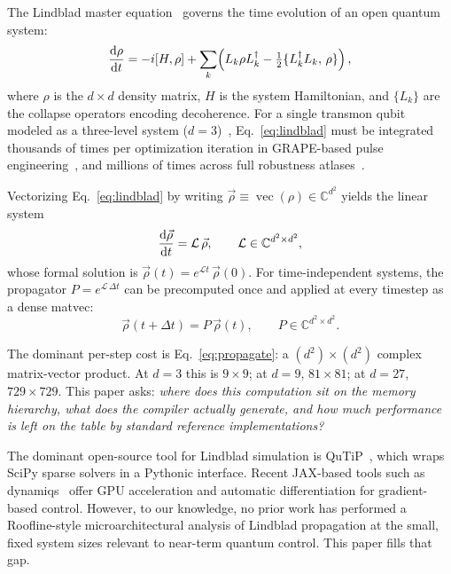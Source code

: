 \documentclass[a4paper,noarxiv]{quantumarticle}
\begin{document}
The Lindblad master equation~\cite{Lindblad1976,Gorini1976} governs the
time evolution of an open quantum system:
\begin{equation}
  \label{eq:lindblad}
  \dv{\rho}{t} = -i[H, \rho]
    + \sum_k \!\left( L_k \rho L_k^\dagger
                    - \tfrac{1}{2}\{L_k^\dagger L_k,\, \rho\} \right),
\end{equation}
where $\rho$ is the $d \times d$ density matrix, $H$ is the system
Hamiltonian, and $\{L_k\}$ are the collapse operators encoding decoherence.
%
For a single transmon qubit modeled as a three-level system
($d = 3$)~\cite{Koch2007}, Eq.~\eqref{eq:lindblad} must be integrated
thousands of times per optimization iteration in GRAPE-based pulse
engineering~\cite{Khaneja2005}, and millions of times across full robustness
atlases~\cite{Malarchick2025QPO}.

Vectorizing Eq.~\eqref{eq:lindblad} by writing $\vec\rho \equiv
\operatorname{vec}(\rho) \in \mathbb{C}^{d^2}$ yields the linear system
\begin{equation}
  \label{eq:lindblad_vec}
  \dv{\vec\rho}{t} = \mathcal{L}\,\vec\rho,
  \qquad \mathcal{L} \in \mathbb{C}^{d^2 \times d^2},
\end{equation}
whose formal solution is $\vec\rho(t) = e^{\mathcal{L} t}\,\vec\rho(0)$.
For time-independent systems, the propagator $P = e^{\mathcal{L}\,\Delta t}$
can be precomputed once and applied at every timestep as a dense matvec:
\begin{equation}
  \label{eq:propagate}
  \vec\rho(t + \Delta t) = P\,\vec\rho(t),
  \qquad P \in \mathbb{C}^{d^2 \times d^2}.
\end{equation}

The dominant per-step cost is Eq.~\eqref{eq:propagate}: a
$(d^2) \times (d^2)$ complex matrix-vector product. At $d = 3$ this is
$9 \times 9$; at $d = 9$, $81 \times 81$; at $d = 27$, $729 \times 729$.
This paper asks: \emph{where does this computation sit on the memory
hierarchy, what does the compiler actually generate, and how much performance
is left on the table by standard reference implementations?}

The dominant open-source tool for Lindblad simulation is
QuTiP~\cite{Johansson2012,Johansson2013}, which wraps SciPy sparse solvers
in a Pythonic interface. Recent JAX-based tools such as
dynamiqs~\cite{Guilmin2024} offer GPU acceleration and automatic
differentiation for gradient-based control. However, to our knowledge, no
prior work has performed a Roofline-style microarchitectural analysis of
Lindblad propagation at the small, fixed system sizes relevant to near-term
quantum control. This paper fills that gap.
\end{document}
